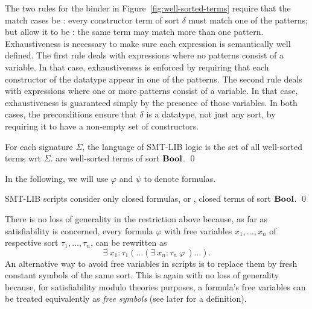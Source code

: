 \begin{remark}
The two rules for the  binder in Figure~\ref{fig:well-sorted-terms} 
require that the match cases be :
every constructor term of sort $\delta$ must match one of the patterns;
but allow it to be :
the same term may match more than one pattern.
Exhaustiveness is necessary to make sure each  expression is
semantically well defined.
The first rule deals with  expressions where no patterns consist 
of a variable.
In that case, exhaustiveness is enforced by requiring that each constructor
of the datatype appear in one of the patterns.
The second rule deals with  expressions where one or more patterns 
consist of a variable.
In that case, exhaustiveness is guaranteed simply by the presence 
of those variables.
In both cases, the preconditions ensure that $\delta$ is a datatype, 
not just any sort, by requiring it to have a non-empty set of constructors.
\end{remark}


\begin{definition}
For each signature $\Sigma$,
the language of SMT-LIB logic is the set of all well-sorted terms
wrt $\Sigma$.
 are well-sorted terms of sort $\textbf{Bool}$.
\qed
\end{definition}

In the following, we will use $\varphi$ and $\psi$ to denote formulas.
\medskip

\begin{constraint}
SMT-LIB scripts consider only closed formulas,
or , closed terms of sort $\textbf{Bool}$.
\qed
\end{constraint}

There is no loss of generality in the restriction above because,
as far as satisfiability is concerned,
every formula $\varphi$ with free variables 
$x_1, \ldots, x_n$ of respective sort $\tau_1, \ldots, \tau_n$,
can be rewritten as 
\[
 \exists\: x_1{:}\tau_1 ( \ldots (\exists\:x_n{:}\tau_n\: \varphi\ )\ldots).
\]
An alternative way to avoid free variables in scripts is 
to replace them by fresh constant symbols of the same sort.
This is again with no loss of generality because,
for satisfiability modulo theories purposes,
a formula's free variables can be treated equivalently as 
\emph{free symbols} (see later for a definition).


